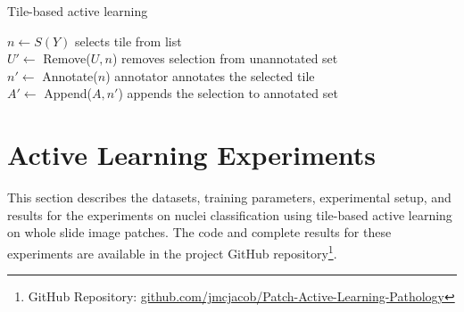 
\begin{algorithm}[h]
	\caption{Tile-based active learning}
	\label{alg:regionbased}
	{
		$n \gets S(Y)$ \hfill selects tile from list\\
		$U' \gets$ Remove($U, n$) \hfill removes selection from unannotated set\\
		$n' \gets$ Annotate($n$) \hfill annotator annotates the selected tile\\
		$A' \gets$ Append($A, n'$) \hfill appends the selection to annotated set\\
	}
\end{algorithm}



\section{Active Learning Experiments}
\label{sec:active_experiments}
This section describes the datasets, training parameters, experimental setup, and results for the experiments on nuclei classification using tile-based active learning on whole slide image patches. The code and complete results for these experiments are available in the project GitHub repository\footnote{GitHub Repository: \url{github.com/jmcjacob/Patch-Active-Learning-Pathology}}.


